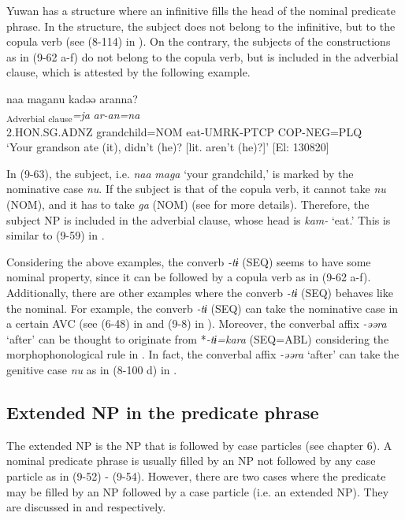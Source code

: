 Yuwan has a structure where an infinitive fills the head of the nominal predicate phrase. In the structure, the subject does not belong to the infinitive, but to the copula verb (see (8-114) in ). On the contrary, the subjects of the constructions as in (9-62 a-f) do not belong to the copula verb, but is included in the adverbial clause, which is attested by the following example.

\ea  \label{ex:9.63}
 \glll  naa  maganu  kadəə  aranna?\\
    [\textit{naa}  \textit{maga=nu}  \textit{kam-tɨ}]\textsubscript{Adverbial clause}\textit{=ja}  \textit{ar-an=na}\\
    2.HON.SG.ADNZ  grandchild=NOM  eat-UMRK-PTCP  COP-NEG=PLQ\\
    \glt     ‘Your grandson ate (it), didn’t (he)? [lit. aren’t (he)?]’ [El: 130820]
\z

In (9-63), the subject, i.e. \textit{naa} \textit{maga} ‘your grandchild,’ is marked by the nominative case \textit{nu}. If the subject is that of the copula verb, it cannot take \textit{nu} (NOM), and it has to take \textit{ga} (NOM) (see  for more details). Therefore, the subject NP is included in the adverbial clause, whose head is \textit{kam-} ‘eat.’ This is similar to (9-59) in .

Considering the above examples, the converb \textit{{}-tɨ} (SEQ) seems to have some nominal property, since it can be followed by a copula verb as in (9-62 a-f). Additionally, there are other examples where the converb \textit{{}-tɨ} (SEQ) behaves like the nominal. For example, the converb \textit{{}-tɨ} (SEQ) can take the nominative case in a certain AVC (see (6-48) in  and (9-8) in ). Moreover, the converbal affix \textit{{}-əəra} ‘after’ can be thought to originate from *\textit{{}-tɨ=kara} (SEQ=ABL) considering the morphophonological rule in . In fact, the converbal affix \textit{{}-əəra} ‘after’ can take the genitive case \textit{nu} as in (8-100 d) in .

\subsection{Extended NP in the predicate phrase}\label{sec:9.3.3}

The extended NP is the NP that is followed by case particles (see chapter 6). A nominal predicate phrase is usually filled by an NP not followed by any case particle as in (9-52) - (9-54). However, there are two cases where the predicate may be filled by an NP followed by a case particle (i.e. an extended NP). They are discussed in  and  respectively.

